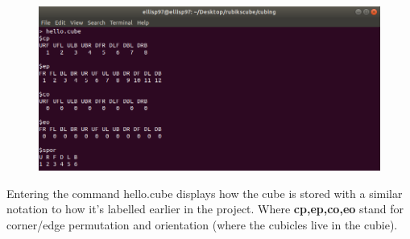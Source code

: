 \documentclass{article}
\begin{document}
\begin{figure}[h]
	\centering
	\includegraphics[scale=.5]{terminalcube.png}
\end{figure}
Entering the command hello.cube displays how the cube is stored with a similar notation to how it's labelled earlier in the project. Where \textbf{cp,ep,co,eo} stand for corner/edge permutation and orientation (where the cubicles live in the cubie).
\end{document}
